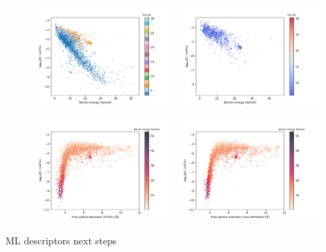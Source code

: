 \documentclass[main]{subfiles}
\begin{document}
\begin{figure}[ht]
  \centering
    \includegraphics[width=0.48\textwidth]{figures/5-diffusion/difflog_barrier_Df_uff.pdf}
    \includegraphics[width=0.48\textwidth]{figures/5-diffusion/difflog_barrier_Df_uff_2.pdf}
    \caption{}\label{fgr:}
\end{figure}

\begin{figure}[ht]
  \centering
    \includegraphics[width=0.48\textwidth]{figures/5-diffusion/difflog_Df-ccdc_barrier.pdf}
    \includegraphics[width=0.48\textwidth]{figures/5-diffusion/difflog_Df-uff298K_barrier.pdf}
    \caption{}\label{fgr:}
\end{figure}

ML descriptors
next steps

\OnlyInSubfile{\printglobalbibliography}
\end{document}
